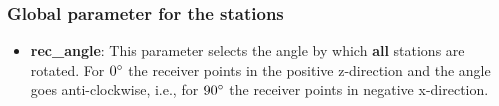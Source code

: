 		\subsubsection{Global parameter for the stations}
			
    	\begin{itemize}
    	 \item \textbf{rec\_angle}: This parameter selects the angle by which \textbf{all} stations are rotated. For $0\degree$ the receiver points in the positive z-direction and the angle goes anti-clockwise, i.e., for $90\degree$ the receiver points in negative x-direction.
    	\end{itemize}
